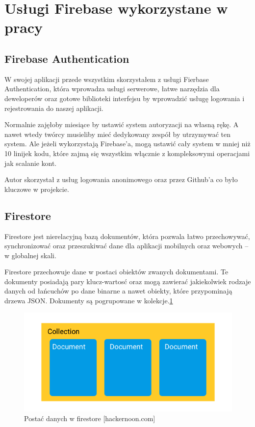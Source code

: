 \section{Usługi Firebase wykorzystane w pracy}

\subsection{Firebase Authentication}

W swojej aplikacji przede wszystkim skorzystałem z usługi Fierbase Authentication,
która wprowadza usługi serwerowe,
łatwe narzędzia dla deweloperów oraz gotowe biblioteki interfejsu by wprowadzić usługę logowania i rejestrowania do naszej aplikacji.

Normalnie zajęłoby miesiące by ustawić system autoryzacji na własną rękę.
A nawet wtedy twórcy musieliby mieć dedykowany zespół by utrzymywać ten system.
Ale jeżeli wykorzystają Firebase’a, mogą ustawić cały system w mniej niż 10 linijek kodu,
które zajmą się wszystkim włącznie z kompleksowymi operacjami jak scalanie kont.

Autor skorzystał z usług logowania anonimowego oraz przez Github’a co było kluczowe w projekcie.

\subsection{Firestore}

Firestore jest nierelacyjną bazą dokumentów, która pozwala łatwo przechowywać,
synchronizować oraz przeszukiwać dane dla aplikacji mobilnych oraz webowych – w globalnej skali.

Firestore przechowuje dane w postaci obiektów zwanych dokumentami.
Te dokumenty posiadają pary klucz-wartosć oraz mogą zawierać jakiekolwiek rodzaje danych od łańcuchów po dane binarne a nawet obiekty,
które przypominają drzewa JSON\@. Dokumenty są pogrupowane w kolekcje.\ref{rys:firestoreData}

\begin{figure}
	\centering\includegraphics[width=.6\textwidth]{img/firestoreData}
	\caption{Postać danych w firestore [hackernoon.com]}\label{rys:firestoreData}%
\end{figure}

